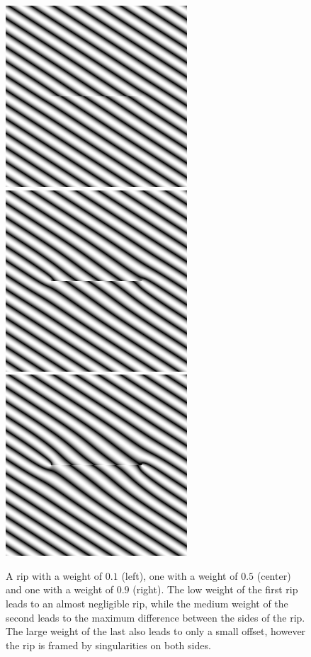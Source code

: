\documentclass{utue} %
\begin{document}
\begin{figure}[ht]
  \centering
  \includegraphics[width=0.3\linewidth]{images/rip01}
  \includegraphics[width=0.3\linewidth]{images/rip05}
  \includegraphics[width=0.3\linewidth]{images/rip09}
  \caption{A rip with a weight of $0.1$ (left), one with a weight of $0.5$ (center) and one with a weight of $0.9$ (right). The low weight of the first rip leads to an almost negligible rip, while the medium weight of the second leads to the maximum difference between the sides of the rip. The large weight of the last also leads to only a small offset, however the rip is framed by singularities on both sides.}\label{fig:ripWeight}
\end{figure}
\end{document}
